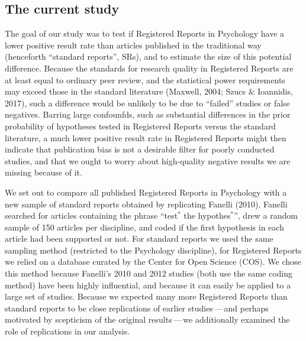 \documentclass[british,,jou,floatsintext]{apa6}
\begin{document}
\hypertarget{the-current-study}{%
\subsection{The current study}\label{the-current-study}}

The goal of our study was to test if Registered Reports in Psychology have a lower positive result rate than articles published in the traditional way (henceforth \enquote{standard reports}, SRs), and to estimate the size of this potential difference.
Because the standards for research quality in Registered Reports are at least equal to ordinary peer review, and the statistical power requirements may exceed those in the standard literature (Maxwell, 2004; Szucs \& Ioannidis, 2017), such a difference would be unlikely to be due to \enquote{failed} studies or false negatives.
Barring large confounfds, such as substantial differences in the prior probability of hypotheses tested in Registered Reports versus the standard literature, a much lower positive result rate in Registered Reports might then indicate that publication bias is not a desirable filter for poorly conducted studies, and that we ought to worry about high-quality negative results we are missing because of it.

We set out to compare all published Registered Reports in Psychology with a new sample of standard reports obtained by replicating Fanelli (2010).
Fanelli searched for articles containing the phrase \enquote{test\(^\ast\) the hypothes\(^\ast\)}, drew a random sample of 150 articles per discipline, and coded if the first hypothesis in each article had been supported or not.
For standard reports we used the same sampling method (restricted to the Psychology discipline), for Registered Reports we relied on a database curated by the Center for Open Science (COS).
We chose this method because Fanelli's 2010 and 2012 studies (both use the same coding method) have been highly influential, and because it can easily be applied to a large set of studies.
Because we expected many more Registered Reports than standard reports to be close replications of earlier studies\(\,\)---\(\,\)and perhaps motivated by scepticism of the original results\(\,\)---\(\,\)we additionally examined the role of replications in our analysis.
\end{document}

